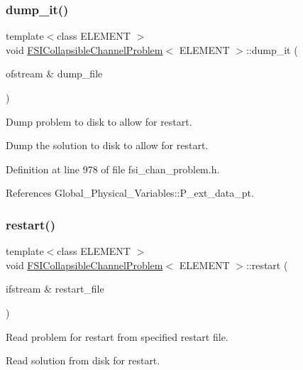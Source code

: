 \subsubsection{\texorpdfstring{dump\+\_\+it()}{dump\_it()}}
{\footnotesize\ttfamily template$<$class E\+L\+E\+M\+E\+NT $>$ \\
void \hyperlink{classFSICollapsibleChannelProblem}{F\+S\+I\+Collapsible\+Channel\+Problem}$<$ E\+L\+E\+M\+E\+NT $>$\+::dump\+\_\+it (\begin{DoxyParamCaption}\item[{ofstream \&}]{dump\+\_\+file }\end{DoxyParamCaption})\hspace{0.3cm}{\ttfamily [protected]}}



Dump problem to disk to allow for restart. 

Dump the solution to disk to allow for restart. 

Definition at line 978 of file fsi\+\_\+chan\+\_\+problem.\+h.



References Global\+\_\+\+Physical\+\_\+\+Variables\+::\+P\+\_\+ext\+\_\+data\+\_\+pt.

\mbox{\label{classFSICollapsibleChannelProblem_a2ee280c8cccc90baae4b0b6744be9efe}} 
\subsubsection{\texorpdfstring{restart()}{restart()}}
{\footnotesize\ttfamily template$<$class E\+L\+E\+M\+E\+NT $>$ \\
void \hyperlink{classFSICollapsibleChannelProblem}{F\+S\+I\+Collapsible\+Channel\+Problem}$<$ E\+L\+E\+M\+E\+NT $>$\+::restart (\begin{DoxyParamCaption}\item[{ifstream \&}]{restart\+\_\+file }\end{DoxyParamCaption})\hspace{0.3cm}{\ttfamily [protected]}}



Read problem for restart from specified restart file. 

Read solution from disk for restart. 


